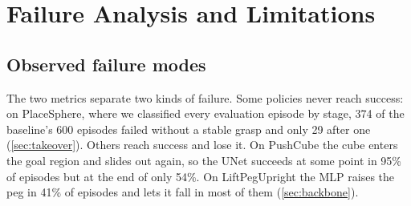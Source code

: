 \section{Failure Analysis and Limitations}
\label{sec:discussion}
\subsection{Observed failure modes}
The two metrics separate two kinds of failure. Some policies never reach
success: on PlaceSphere, where we classified every evaluation episode by
stage, 374 of the baseline's 600 episodes failed without a stable grasp and
only 29 after one (\cref{sec:takeover}). Others reach success and lose it. On
PushCube the cube enters the goal region and slides out again, so the UNet
succeeds at some point in 95\% of episodes but at the end of only 54\%. On
LiftPegUpright the MLP raises the peg in 41\% of episodes and lets it fall in
most of them (\cref{sec:backbone}).

